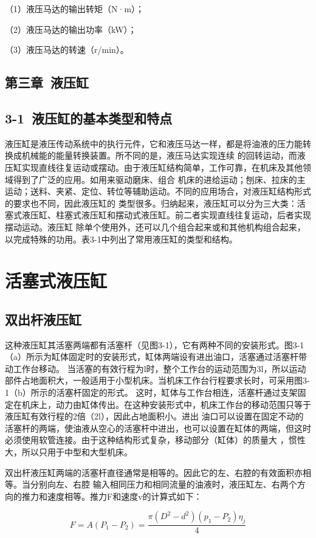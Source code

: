（1）液压马达的输出转矩（N·m）；

（2）液压马达的输出功率（kW）；

（3）液压马达的转速（r/min）。

\newpage

\begin{center}
\section{第三章\  液压缸}


\subsection{3-1\  液压缸的基本类型和特点}
\end{center}

液压缸是液压传动系统中的执行元件，它和液压马达一样，都是将油液的压力能转换成机械能的能量转换装置。所不同的是，液压马达实现连续
的回转运动，而液压缸实现直线往复运动或摆动。由于液压缸结构简单，工作可靠，在机床及其他领域得到了广泛的应用。如用来驱动磨床、组合
机床的进给运动；刨床、拉床的主运动；送料、夹紧、定位、转位等辅助运动。不同的应用场合，对液压缸结构形式的要求也不同，因此液压缸的
类型很多。归纳起来，液压缸可以分为三大类：活塞式液压缸、柱塞式液压缸和摆动式液压缸。前二者实现直线往复运动，后者实现摆动运动。液压缸
除单个使用外，还可以几个组合起来或和其他机构组合起来，以完成特殊的功用。表3-1中列出了常用液压缸的类型和结构。

\newpage

\section{活塞式液压缸}
\subsection{双出杆液压缸}

这种液压缸其活塞两端都有活塞杆（见图3-1），它有两种不同的安装形式。图3-1（a）所示为缸体固定时的安装形式，缸体两端设有进出油口，活塞通过活塞杆带动工作台移动。
当活塞的有效行程为l时，整个工作台的运动范围为3l，所以运动部件占地面积大，一般适用于小型机床。当机床工作台行程要求长时，可采用图3-1（b）所示的活塞杆固定的形式。
这时，缸体与工作台相连，活塞杆通过支架固定在机床上，动力由缸体传出。在这种安装形式中，机床工作台的移动范围只等于液压缸有效行程的2倍（2l），因此占地面积小。进出
油口可以设置在固定不动的活塞杆的两端，使油液从空心的活塞杆中进出，也可以设置在缸体的两端，但这时必须使用软管连接。由于这种结构形式复杂，移动部分（缸体）的质量大
，惯性大，所以只用于中型和大型机床。

双出杆液压缸两端的活塞杆直径通常是相等的。因此它的左、右腔的有效面积亦相等。当分别向左、右腔
输入相同压力和相同流量的油液时，液压缸左、右两个方向的推力和速度相等。推力F和速度v的计算式如下：

\begin{equation}
F=A(P_1-P_2)=\frac{\pi(D^2-d^2)(p_1-P_2)\eta_j}{4}
\end{equation}


